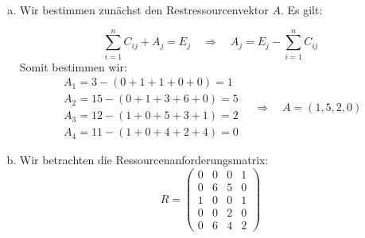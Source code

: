\documentclass[numbers=noendperiod]{scrartcl}
\begin{document}
\begin{enumerate}[a)]
	\item Wir bestimmen zunächst den Restressourcenvektor $A$. Es gilt:
	
	\begin{equation}
		\sum_{i=1}^{n} C_{ij} + A_j = E_j \quad \Rightarrow \quad A_j = E_j - \sum_{i=1}^{n} C_{ij}
	\end{equation}
	Somit bestimmen wir:
	\begin{equation}
		\begin{matrix}
		A_1 = 3 - (0+1+1+0+0) = 1\\
		A_2 = 15 - (0+1+3+6+0) = 5\\
		A_3 = 12 - (1+0+5+3+1) = 2\\
		A_4 = 11 - (1+0+4+2+4) = 0
		\end{matrix}
		\quad \Rightarrow \quad A = (1,5,2,0)
	\end{equation}
	
	\item Wir betrachten die Ressourcenanforderungsmatrix:
	\begin{equation}
		R = \begin{pmatrix}
		0 & 0 & 0 & 1\\
		0 & 6 & 5 & 0\\
		1 & 0 & 0 & 1\\
		0 & 0 & 2 & 0\\
		0 & 6 & 4 & 2
		\end{pmatrix}
	\end{equation}
	

\end{enumerate}
\end{document}
